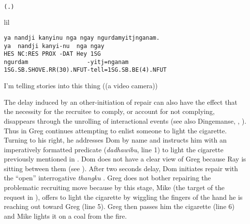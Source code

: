 \documentclass[output=paper,nonflat,colorlinks,citecolor=brown]{langsci/langscibook}
\begin{document}
%
\begin{transbox}{9}{~}
\begin{verbatim}
(.)
\end{verbatim}
\end{transbox}\vspace{-2mm}
%
\begin{transbox}{10}{lil}
\begin{verbatim}
ya nandji kanyinu nga ngay ngurdamyitjnganam.
ya  nandji kanyi-nu  nga ngay
HES NC:RES PROX -DAT Hey 1SG
ngurdam                 -yitj=nganam
1SG.SB.SHOVE.RR(30).NFUT-tell=1SG.SB.BE(4).NFUT
\end{verbatim}
I'm telling stories into this thing ((a video camera))
\end{transbox}\bigskip

The delay induced by an other-initiation of repair can also have the effect that the necessity for the recruitee to comply, or account for not complying, disappears through the unrolling of interactional events (see also Dingemanse, , ). Thus in  Greg continues attempting to enlist someone to light the cigarette. Turning to his right, he addresses Dom by name and instructs him with an imperatively formatted predicate (\textit{dadhawibu}, line 1) to light the cigarette previously mentioned in . Dom does not have a clear view of Greg because Ray is sitting between them (see ). After two seconds delay, Dom initiates repair with the “open” interrogative \textit{thangku} \citep{Blythe2015}. Greg does not bother repairing the problematic recruiting move because by this stage, Mike (the target of the request in ), offers to light the cigarette by wiggling the fingers of the hand he is reaching out toward Greg (line 5). Greg then passes him the cigarette (line 6) and Mike lights it on a coal from the fire.
\end{document}
